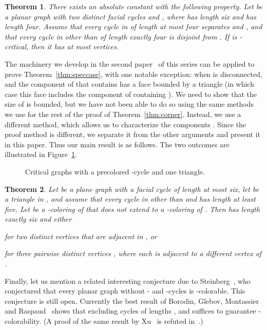 \documentclass{article}
\def\mytextindent#1{\indent\indent\llap{\rm#1\enspace}\ignorespaces}
\def\myitem{\par\hangindent30pt\mytextindent}
\def\mylabel#1{{\label{#1}}}
\newtheorem{theorem}{Theorem}
\begin{document}
\begin{theorem}
\mylabel{thm:speccase}
There exists an absolute constant  with the following property.
Let  be a planar graph with two distinct facial cycles  and ,
where  has length six and  has length four.
Assume that every cycle in  of length at most four separates  and 
, and that every cycle in  other than  of length exactly four is disjoint
from .
If  is -critical, then it has at most  vertices.
\end{theorem}

The machinery we develop in the second paper~\cite{proof-druhy} 
of this series can be
applied to prove Theorem~\ref{thm:speccase}, with one notable
exception: when  is disconnected, and the component  of 
that contains  has a face bounded by a triangle
(in which case this face includes the component of  containing ).
We need to show that the size of  is bounded, but we have not been able to do
so using the same methods we use for the rest of the proof of 
Theorem~\ref{thm:corner}.
Instead, we use a different method, which allows us to characterize
the components .
Since the proof method is different, we separate it from the other
arguments and present it in this paper.
Thus our main result is as follows.
The two outcomes are illustrated in Figure~\ref{fig-6plus3}.

\begin{figure}
\begin{center}\end{center}
\caption{Critical graphs with a precolored -cycle and one triangle.}
\label{fig-6plus3}
\end{figure}

\begin{theorem}
\mylabel{thm-6plus3}
Let  be a plane graph with a facial cycle  of length at most six,
let  be a triangle in , and assume that
every cycle in  other than  and  has length at least five.
Let  be a -coloring of  that does not extend to a -coloring
of . Then  has length exactly six and either
\myitem{(a)} for two distinct vertices  that are
adjacent in , or
\myitem{(b)} for three pairwise distinct
vertices , where each  is adjacent to a different
vertex of .
\end{theorem}

Finally, let us mention a related interesting conjecture due to
Steinberg~\cite{conj-stein}, who conjectured that every planar graph 
without - and -cycles is -colorable.
This conjecture is still open. 
Currently the best result of 
Borodin, Glebov, Montassier and Raspaud~\cite{BorGleMonRas}
shows that excluding cycles 
of lengths ,  and  suffices to guarantee -colorability. 
(A proof of the same result by Xu~\cite{xu} is refuted in~\cite{BorGleMonRas}.)
\end{document}
